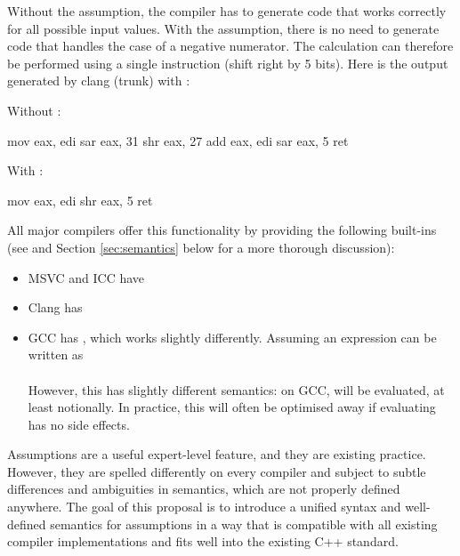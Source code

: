 Without the assumption, the compiler has to generate code that works correctly for all possible input values. With the assumption, there is no need to generate code that handles the case of a negative numerator. The calculation can therefore be performed using a single instruction (shift right by 5 bits). Here is the output generated by clang (trunk) with :

\begin{multicols}{2}
Without :

\begin{codeblock}
  mov eax, edi
  sar eax, 31
  shr eax, 27
  add eax, edi
  sar eax, 5
  ret
\end{codeblock}

\columnbreak

With :

\begin{codeblock}
  mov eax, edi
  shr eax, 5
  ret
\end{codeblock}

\end{multicols}

All major compilers offer this functionality by providing the following built-ins (see \cite{N4425} and Section \ref{sec:semantics} below for a more thorough discussion):
\begin{itemize}
\item MSVC and ICC have 
\item Clang has 
\item GCC has , which works slightly differently. Assuming an expression can be written as \vspace{3mm}
\\ \vspace{3mm}
  \\
However, this has slightly different semantics: on GCC,  will be evaluated, at least notionally. In practice, this will often be optimised away if evaluating  has no side effects. 
\end{itemize}

Assumptions are a useful expert-level feature, and they are existing practice. However, they are spelled differently on every compiler and subject to subtle differences and ambiguities in semantics, which are not properly defined anywhere. The goal of this proposal is to introduce a unified syntax and well-defined semantics for assumptions in a way that is compatible with all existing compiler implementations and fits well into the existing C++ standard.

